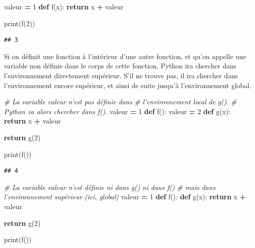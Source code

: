 \documentclass[12pt,]{book}
\newenvironment{Shaded}{\begin{snugshade}}{\end{snugshade}}
\newcommand{\KeywordTok}[1]{\textcolor[rgb]{0.13,0.29,0.53}{\textbf{#1}}}
\newcommand{\DecValTok}[1]{\textcolor[rgb]{0.00,0.00,0.81}{#1}}
\newcommand{\CommentTok}[1]{\textcolor[rgb]{0.56,0.35,0.01}{\textit{#1}}}
\newcommand{\ControlFlowTok}[1]{\textcolor[rgb]{0.13,0.29,0.53}{\textbf{#1}}}
\newcommand{\OperatorTok}[1]{\textcolor[rgb]{0.81,0.36,0.00}{\textbf{#1}}}
\newcommand{\BuiltInTok}[1]{#1}
\newcommand{\NormalTok}[1]{#1}
\numberwithin{equation}{section}
\numberwithin{countremarque}{section}
\begin{document}
\begin{Shaded}
\begin{Highlighting}[]
\NormalTok{valeur }\OperatorTok{=} \DecValTok{1}
\KeywordTok{def}\NormalTok{ f(x):}
  \ControlFlowTok{return}\NormalTok{ x }\OperatorTok{+}\NormalTok{ valeur}
  
\BuiltInTok{print}\NormalTok{(f(}\DecValTok{2}\NormalTok{))}
\end{Highlighting}
\end{Shaded}

\begin{lstlisting}
## 3
\end{lstlisting}

Si on définit une fonction à l'intérieur d'une autre fonction, et qu'on
appelle une variable non définie dans le corps de cette fonction, Python
ira chercher dans l'environnement directement supérieur. S'il ne trouve
pas, il ira chercher dans l'environnement encore supérieur, et ainsi de
suite jusqu'à l'environnement global.

\begin{Shaded}
\begin{Highlighting}[]
\CommentTok{# La variable valeur n'est pas définie dans}
\CommentTok{# l'environnement local de g().}
\CommentTok{# Python va alors chercher dans f().}
\NormalTok{valeur }\OperatorTok{=} \DecValTok{1}
\KeywordTok{def}\NormalTok{ f():}
\NormalTok{  valeur }\OperatorTok{=} \DecValTok{2}
  \KeywordTok{def}\NormalTok{ g(x):}
    \ControlFlowTok{return}\NormalTok{ x }\OperatorTok{+}\NormalTok{ valeur}

  \ControlFlowTok{return}\NormalTok{ g(}\DecValTok{2}\NormalTok{)}

\BuiltInTok{print}\NormalTok{(f())}
\end{Highlighting}
\end{Shaded}

\begin{lstlisting}
## 4
\end{lstlisting}

\begin{Shaded}
\begin{Highlighting}[]
\CommentTok{# La variable valeur n'est définie ni dans g() ni dans f()}
\CommentTok{# mais dans l'environnement supérieur (ici, global)}
\NormalTok{valeur }\OperatorTok{=} \DecValTok{1}
\KeywordTok{def}\NormalTok{ f():}
  \KeywordTok{def}\NormalTok{ g(x):}
    \ControlFlowTok{return}\NormalTok{ x }\OperatorTok{+}\NormalTok{ valeur}

  \ControlFlowTok{return}\NormalTok{ g(}\DecValTok{2}\NormalTok{)}

\BuiltInTok{print}\NormalTok{(f())}
\end{Highlighting}
\end{Shaded}
\end{document}
